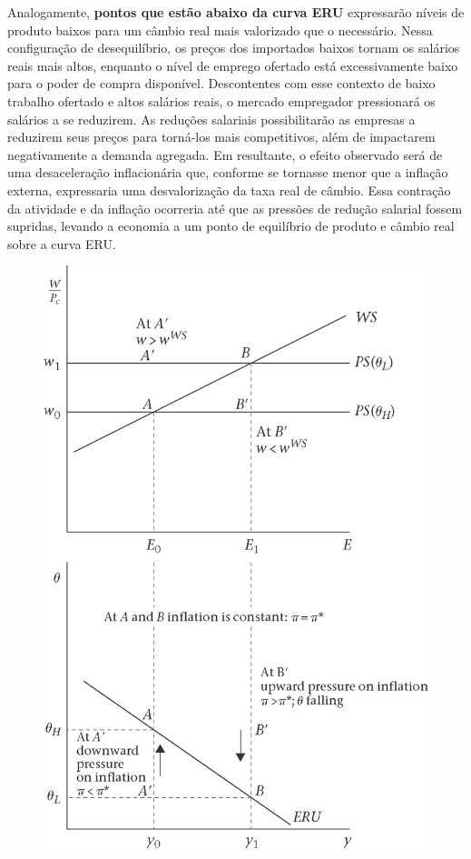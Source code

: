 \documentclass[a4paper,12pt]{article}[abntex2]
\begin{document}
Analogamente, \textbf{pontos que estão abaixo da curva ERU} expressarão níveis de produto baixos para um câmbio  real  mais  valorizado  que  o  necessário.  Nessa configuração  de  desequilíbrio,  os preços  dos importados baixos tornam os salários reais mais altos, enquanto o nível de emprego ofertado está excessivamente baixo para o poder de compra disponível. Descontentes com esse contexto de baixo trabalho ofertado e altos salários reais, o mercado empregador pressionará os salários a se reduzirem. As reduções salariais possibilitarão as empresas a reduzirem seus preços para torná-los mais competitivos, além de impactarem negativamente a demanda agregada. Em resultante, o efeito observado será de uma desaceleração inflacionária que, conforme se tornasse menor que a inflação externa, expressaria uma desvalorização da taxa real de câmbio. Essa contração da atividade e da inflação ocorreria até que as pressões de redução salarial fossem supridas, levando a economia a um ponto de equilíbrio de produto e câmbio real sobre a curva ERU. 


\begin{figure}[H]
    \centering
    \includegraphics[width=0.7\linewidth]{Imagens/a26i3.png}
\end{figure}
\end{document}
